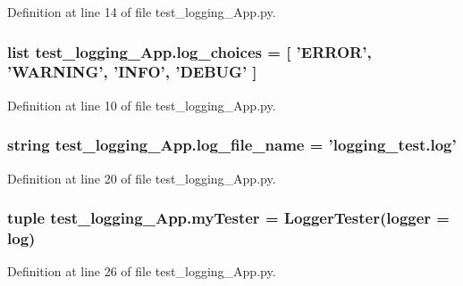 Definition at line 14 of file test\-\_\-logging\-\_\-\-App.\-py.

\subsubsection[{log\-\_\-choices}]{\setlength{\rightskip}{0pt plus 5cm}list test\-\_\-logging\-\_\-\-App.\-log\-\_\-choices = \mbox{[} 'E\-R\-R\-O\-R', 'W\-A\-R\-N\-I\-N\-G', 'I\-N\-F\-O', 'D\-E\-B\-U\-G' \mbox{]}}\label{namespacetest__logging__App_af6aae0be66083e03432f922a877d6e76}


Definition at line 10 of file test\-\_\-logging\-\_\-\-App.\-py.

\subsubsection[{log\-\_\-file\-\_\-name}]{\setlength{\rightskip}{0pt plus 5cm}string test\-\_\-logging\-\_\-\-App.\-log\-\_\-file\-\_\-name = 'logging\-\_\-test.\-log'}\label{namespacetest__logging__App_aed9c64e956bc04064d38fc2d1bf77201}


Definition at line 20 of file test\-\_\-logging\-\_\-\-App.\-py.

\subsubsection[{my\-Tester}]{\setlength{\rightskip}{0pt plus 5cm}tuple test\-\_\-logging\-\_\-\-App.\-my\-Tester = {\bf Logger\-Tester}(logger = {\bf log})}\label{namespacetest__logging__App_afaeeba25074786a02ffb0098ab24315d}


Definition at line 26 of file test\-\_\-logging\-\_\-\-App.\-py.

